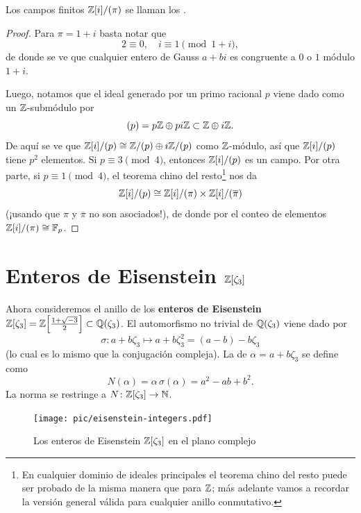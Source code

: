 Los campos finitos $\mathbb{Z} [i]/(\pi)$ se llaman los .

\begin{proof}
  Para $\pi = 1+i$ basta notar que
  $$2 \equiv 0, \quad i \equiv 1 \pmod{1+i},$$
  de donde se ve que cualquier entero de Gauss $a+bi$ es congruente a $0$ o
  $1$ módulo $1+i$.

  Luego, notamos que el ideal generado por un primo racional $p$ viene dado
  como un $\mathbb{Z}$-submódulo por
  $$(p) = p\mathbb{Z} \oplus pi\mathbb{Z} \subset \mathbb{Z} \oplus i\mathbb{Z}.$$
  De aquí se ve que $\mathbb{Z}[i]/(p) \cong \mathbb{Z}/(p) \oplus i\mathbb{Z}/(p)$ como
  $\mathbb{Z}$-módulo, así que $\mathbb{Z}[i]/(p)$ tiene $p^2$ elementos.
  Si $p \equiv 3 \pmod{4}$, entonces $\mathbb{Z}[i]/(p)$ es un campo. Por otra parte,
  si $p \equiv 1 \pmod{4}$, el teorema chino del resto\footnote{En cualquier
    dominio de ideales principales el teorema chino del resto puede ser
    probado de la misma manera que para $\mathbb{Z}$; más adelante vamos a recordar
    la versión general válida para cualquier anillo conmutativo.} nos da
  $$\mathbb{Z}[i]/(p) \cong \mathbb{Z}[i]/(\pi) \times \mathbb{Z}[i]/(\overline{\pi})$$
  (¡usando que $\pi$ y $\overline{\pi}$ no son asociados!), de donde por el
  conteo de elementos $\mathbb{Z}[i]/(\pi) \cong \mathbb{F}_p$.
\end{proof}


\section{Enteros de Eisenstein \texorpdfstring{$\mathbb{Z} [\zeta_3]$}{ℤ[ζ₃]}}

Ahora consideremos el anillo de los \textbf{enteros de Eisenstein}
$\mathbb{Z} [\zeta_3] = \mathbb{Z} \Bigl[\frac{1+\sqrt{-3}}{2}\Bigr] \subset \mathbb{Q} (\zeta_3)$.
El automorfismo no trivial de $\mathbb{Q} (\zeta_3)$ viene dado por
$$\sigma\colon a + b\zeta_3 \mapsto a + b\zeta_3^2 = (a-b) - b\zeta_3$$
(lo cual es lo mismo que la conjugación compleja). La  de
$\alpha = a + b\zeta_3$ se define como
$$N (\alpha) = \alpha\,\sigma (\alpha) = a^2 - ab + b^2.$$
La norma se restringe a $N\colon \mathbb{Z} [\zeta_3] \to \mathbb{N}$.

\begin{figure}
  \begin{center}
    \texttt{[image: pic/eisenstein-integers.pdf]}
  \end{center}

  \caption{Los enteros de Eisenstein $\mathbb{Z} [\zeta_3]$ en el plano complejo}
\end{figure}

